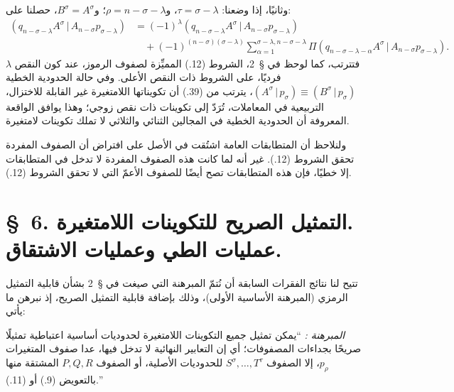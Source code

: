 \documentclass[11pt]{article}
\newcommand{\srcLTR}[1]{\relax\ifmmode\text{\mbox{\babelsublr{\foreignlanguage{english}{#1}}}}\else\babelsublr{\foreignlanguage{english}{#1}}\fi}
\providecommand{\pair}[2]{(#1\,|\,#2)}
\begin{document}
وثانيًا، إذا وضعنا: $\tau=\sigma-\lambda$، و$\rho=n-\sigma-\lambda$؛ و$B^\sigma=A^\sigma$، حصلنا على:
\begin{equation}
\begin{aligned}
\pair{q_{n-\sigma-\lambda}A^\sigma}{A_{n-\sigma}p_{\sigma-\lambda}}
&=(-1)^\lambda\pair{q_{n-\sigma-\lambda}A^\sigma}{A_{n-\sigma}p_{\sigma-\lambda}}\\
&\quad+(-1)^{(n-\sigma)(\sigma-\lambda)}
 \sum_{\alpha=1}^{\sigma-\lambda,n-\sigma-\lambda}
 \Pi\pair{q_{n-\sigma-\lambda-\alpha}A^\sigma}{A_{n-\sigma}p_{\sigma-\lambda}}.
\end{aligned}
\tag{39}
\end{equation}
فتترتب، كما لوحظ في \S\ 2، الشروط (12.) المميِّزة لصفوف الرموز، عند كون النقص $\lambda$ فرديًا، على الشروط ذات النقص الأعلى. وفي حالة الحدودية الخطية $\pair{A^\sigma}{p_\sigma}\equiv\pair{B^\sigma}{p_\sigma}$، يترتب من (39.) أن تكويناتها اللامتغيرة غير القابلة للاختزال، التربيعية في المعاملات، تُرَدّ إلى تكوينات ذات نقص زوجي؛ وهذا يوافق الواقعة المعروفة أن الحدودية الخطية في المجالين الثنائي والثلاثي لا تملك تكوينات لامتغيرة.

ولنلاحظ أن المتطابقات العامة اشتُقت في الأصل على افتراض أن الصفوف المفردة تحقق الشروط (12.). غير أنه لما كانت هذه الصفوف المفردة لا تدخل في المتطابقات إلا خطيًا، فإن هذه المتطابقات تصح أيضًا للصفوف الأعمّ التي لا تحقق الشروط (12.).

\section*{\S\ 6. التمثيل الصريح للتكوينات اللامتغيرة.\\عمليات الطي وعمليات الاشتقاق.}
تتيح لنا نتائج الفقرات السابقة أن نُتمّ المبرهنة التي صيغت في \S\ 2 بشأن قابلية التمثيل الرمزي (المبرهنة الأساسية الأولى)، وذلك بإضافة قابلية التمثيل الصريح، إذ نبرهن ما يأتي:

\emph{المبرهنة \srcLTR{IV}:} ``يمكن تمثيل جميع التكوينات اللامتغيرة لحدوديات أساسية اعتباطية تمثيلًا صريحًا بجداءات المصفوفات؛ أي إن التعابير النهائية لا تدخل فيها، عدا صفوف المتغيرات $p_\rho$، إلا الصفوف $S^\sigma,\ldots,T^\tau$ للحدوديات الأصلية، أو الصفوف $P,Q,R$ المشتقة منها بالتعويض (9.) أو (11.).''
\end{document}
